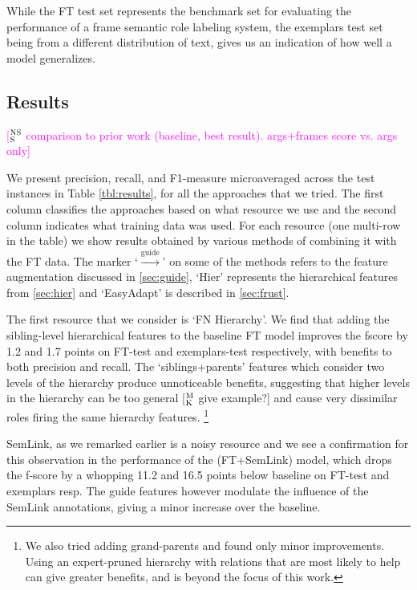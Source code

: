 \documentclass[11pt,a4paper]{article}
\newcommand{\ensuretext}[1]{#1}
\newcommand{\nssmarker}{\ensuretext{\textcolor{magenta}{\ensuremath{^{\textsc{NS}}_{\textsc{S}}}}}}
\newcommand{\mkmarker}{\ensuretext{\textcolor{mdgreen}{\ensuremath{^{\textsc{M}}_{\textsc{K}}}}}}
\newcommand{\arkcomment}[3]{\ensuretext{\textcolor{#3}{[#1 #2]}}}
\newcommand{\nss}[1]{\arkcomment{\nssmarker}{#1}{magenta}}
\newcommand{\mk}[1]{\arkcomment{\mkmarker}{#1}{mdgreen}}
\begin{document}
While the FT test set represents the benchmark set for evaluating the 
performance of a frame semantic role labeling system, the exemplars test set being from a different distribution of text, gives us
an indication of how well a model generalizes.

\subsection{Results}

\nss{comparison to prior work (baseline, best result). args+frames score vs. args only}

We present precision, recall, and F1-measure microaveraged across the test instances in Table \ref{tbl:results}, for all the approaches that we tried.
The first column classifies the approaches based on what resource we use and the second column indicates what training data was used. 
For each resource (one multi-row in the table) we show results obtained by various methods of combining it with the FT data.
The marker `$\xrightarrow{\text{guide}}$' on some of the methods refers to the feature augmentation discussed in \cref{sec:guide},
`Hier' represents the hierarchical features from \cref{sec:hier} and `EasyAdapt' is described in \cref{sec:frust}.



The first resource that we consider is `FN Hierarchy'. We find that adding the sibling-level hierarchical features to the baseline FT model improves 
the fscore by 1.2 and 1.7 points on FT-test and exemplars-test respectively,
with benefits to both precision and recall. The `siblings+parents' features which consider two levels of the hierarchy produce unnoticeable benefits,
suggesting that higher levels in the hierarchy can be too general \mk{give example?} and cause very dissimilar roles firing the same hierarchy features.
\footnote{We also tried adding grand-parents and found only minor improvements. Using an expert-pruned hierarchy with relations that are
most likely to help can give greater benefits, and is beyond the focus of this work.}

SemLink, as we remarked earlier is a noisy resource and we see a confirmation for this observation in the performance of the (FT+SemLink) model,
which drops the f-score by a whopping 11.2 and 16.5 points below baseline on FT-test and exemplars resp. The guide features however modulate the influence
of the SemLink annotations, giving a minor increase over the baseline. 
\end{document}
